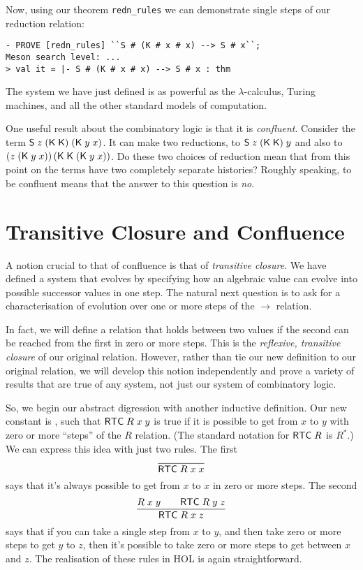 \documentclass[12pt]{article}
\newcommand{\KC}{\con{K}}
\newcommand{\SC}{\con{S}}
\begin{document}
Now, using our theorem \texttt{redn\_rules} we can demonstrate single
steps of our reduction relation:
\begin{session}\begin{verbatim}
- PROVE [redn_rules] ``S # (K # x # x) --> S # x``;
Meson search level: ...
> val it = |- S # (K # x # x) --> S # x : thm
\end{verbatim}\end{session}
    The system we have just defined is as powerful as the
    $\lambda$-calculus, Turing machines, and all the other standard
    models of computation.

    One useful result about the combinatory logic is that it is
    \emph{confluent}.  Consider the term $\SC\;z\;(\KC\;\KC)\;(\KC\;
    y\; x)$.  It can make two reductions, to $\SC\;z\;(\KC\;\KC)\;y$
    and also to $(z\;(\KC\;y\;x))\,(\KC\;\KC\;(\KC\;y\;x))$.  Do these
    two choices of reduction mean that from this point on the terms
    have two completely separate histories?  Roughly speaking, to be
    confluent means that the answer to this question is \emph{no}.


\section{Transitive Closure and Confluence}
\label{sec:Transitive-Clos-Conf}

A notion crucial to that of confluence is that of \emph{transitive
  closure}.  We have defined a system that evolves by specifying how
an algebraic value can evolve into possible successor values in one
step.  The natural next question is to ask for a characterisation of
evolution over one or more steps of the $\rightarrow$ relation.

In fact, we will define a relation that holds between two values if
the second can be reached from the first in zero or more steps.  This
is the \emph{reflexive, transitive closure} of our original relation.
However, rather than tie our new definition to our original relation,
we will develop this notion independently and prove a variety of
results that are true of any system, not just our system of
combinatory logic.

So, we begin our abstract digression with another inductive
definition.  Our new constant is , such that
${\sf RTC}\;R\;x\;y$ is true if it is possible to get from $x$ to $y$
with zero or more ``steps'' of the $R$ relation.  (The standard
notation for ${\sf RTC}\;R$ is $R^*$.) We can express this idea with
just two rules.  The first \[ \infer{\con{RTC}\;R\;x\;x}{} \] says
that it's always possible to get from $x$ to $x$ in zero or more
steps.  The second \[
\infer{\con{RTC}\;R\;x\;z}{R\;x\;y\qquad\con{RTC}\;R\;y\;z}
\] says that if you can take a single step from $x$ to $y$, and then
take zero or more steps to get $y$ to $z$, then it's possible to take
zero or more steps to get between $x$ and $z$.  The realisation of
these rules in HOL is again straightforward.
\end{document}
